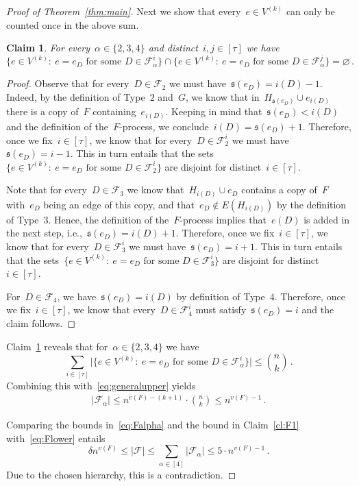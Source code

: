 \documentclass[reqno, 12pt]{amsart}
\numberwithin{equation}{section}
\numberwithin{figure}{section}
\let\emptyset=\varnothing
\newcommand{\cF}{\mathcal{F}}
\theoremstyle{plain}
\newtheorem{claim}[theorem]{Claim}
\theoremstyle{note}
\theoremstyle{remark}
\begin{document}
\begin{proof}[Proof of Theorem~\ref{thm:main}]
    Next we show that every~$e\in V^{(k)}$ can only be counted once in the above sum.
    \begin{claim}\label{cl:disjointsets}
        For every~$\alpha\in\{2,3,4\}$ and distinct~$i,j\in[\tau]$ we have $$\{e\in V^{(k)}:\:e=e_D\text{ for some }D\in\cF_{\alpha}^i\}\cap\{e\in V^{(k)}:\:e=e_D\text{ for some }D\in\cF_{\alpha}^j\}=\emptyset\,.$$
    \end{claim}

    \begin{proof}
        Observe that for every~$D\in\cF_2$ we must have~$\mathfrak{s}(e_D)=i(D)-1$.
        Indeed, by the definition of Type~$2$ and~$G$, we know that in~$H_{\mathfrak{s}(e_D)}\cup e_{i(D)}$ there is a copy of~$F$ containing~$e_{i(D)}$.
        Keeping in mind that~$\mathfrak{s}(e_D)<i(D)$ and the definition of the~$F$-process, we conclude~$i(D)=\mathfrak{s}(e_D)+1$.
        Therefore, once we fix~$i\in[\tau]$, we know that for every~$D\in\cF_2^i$ we must have~$\mathfrak{s}(e_D)=i-1$.
        This in turn entails that the sets~$\{e\in V^{(k)}:\:e=e_D\text{ for some }D\in\cF_2^i\}$ are disjoint for distinct~$i\in[\tau]$.
        
        Note that for every~$D\in\cF_3$ we know that~$H_{i(D)}\cup e_D$ contains a copy of~$F$ with~$e_D$ being an edge of this copy, and that~$e_D\notin E(H_{i(D)})$ by the definition of Type~$3$.
        Hence, the definition of the~$F$-process implies that~$e(D)$ is added in the next step, i.e.,~$\mathfrak{s}(e_D)=i(D)+1$.
        Therefore, once we fix~$i\in[\tau]$, we know that for every~$D\in\cF_3^i$ we must have~$\mathfrak{s}(e_D)=i+1$.
        This in turn entails that the sets~$\{e\in V^{(k)}:\:e=e_D\text{ for some }D\in\cF_3^i\}$ are disjoint for distinct~$i\in[\tau]$.
        
        For~$D\in\cF_4$, we have~$\mathfrak{s}(e_D)=i(D)$ by definition of Type~$4$.
        Therefore, once we fix~$i\in[\tau]$, we know that every~$D\in\cF_4^i$ must satisfy~$\mathfrak{s}(e_D)=i$ and the claim follows.
    \end{proof}

    Claim~\ref{cl:disjointsets} reveals that for~$\alpha\in\{2,3,4\}$ we have $$\sum_{i \in [\tau]}\big\vert\{e\in V^{(k)}:\:e=e_D\text{ for some }D\in\cF_{\alpha}^i\}\big\vert\leq\binom{n}{k}\,.$$
    Combining this with~\eqref{eq:generalupper} yields
    \begin{align}\label{eq:Falpha}
        \vert\cF_{\alpha}\vert\leq n^{v(F)-(k+1)}\cdot\binom{n}{k}\leq n^{v(F)-1}\,.
    \end{align}

    Comparing the bounds in~\eqref{eq:Falpha} and the bound in Claim~\ref{cl:F1} with~\eqref{eq:Flower} entails
    $$\delta n^{v(F)}\leq\vert\cF\vert\leq\sum_{\alpha\in[4]}\vert\cF_{\alpha}\vert\leq 5\cdot n^{v(F)-1}\,.$$
    Due to the chosen hierarchy, this is a contradiction.
    \end{proof}
\end{document}
